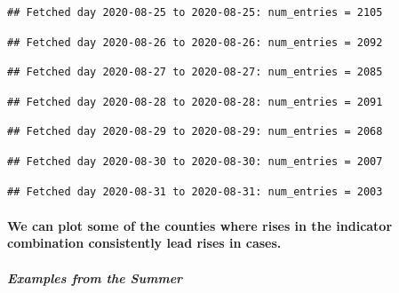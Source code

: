 \documentclass[]{article}
\let\oldparagraph\paragraph
\renewcommand{\paragraph}[1]{\oldparagraph{#1}\mbox{}}
\let\oldsubparagraph\subparagraph
\renewcommand{\subparagraph}[1]{\oldsubparagraph{#1}\mbox{}}
\begin{document}
\begin{verbatim}
## Fetched day 2020-08-25 to 2020-08-25: num_entries = 2105
\end{verbatim}

\begin{verbatim}
## Fetched day 2020-08-26 to 2020-08-26: num_entries = 2092
\end{verbatim}

\begin{verbatim}
## Fetched day 2020-08-27 to 2020-08-27: num_entries = 2085
\end{verbatim}

\begin{verbatim}
## Fetched day 2020-08-28 to 2020-08-28: num_entries = 2091
\end{verbatim}

\begin{verbatim}
## Fetched day 2020-08-29 to 2020-08-29: num_entries = 2068
\end{verbatim}

\begin{verbatim}
## Fetched day 2020-08-30 to 2020-08-30: num_entries = 2007
\end{verbatim}

\begin{verbatim}
## Fetched day 2020-08-31 to 2020-08-31: num_entries = 2003
\end{verbatim}

\hypertarget{we-can-plot-some-of-the-counties-where-rises-in-the-indicator-combination-consistently-lead-rises-in-cases.}{%
\paragraph{We can plot some of the counties where rises in the indicator
combination consistently lead rises in
cases.}\label{we-can-plot-some-of-the-counties-where-rises-in-the-indicator-combination-consistently-lead-rises-in-cases.}}

\hypertarget{examples-from-the-summer-2}{%
\subparagraph{Examples from the
Summer}\label{examples-from-the-summer-2}}
\end{document}
